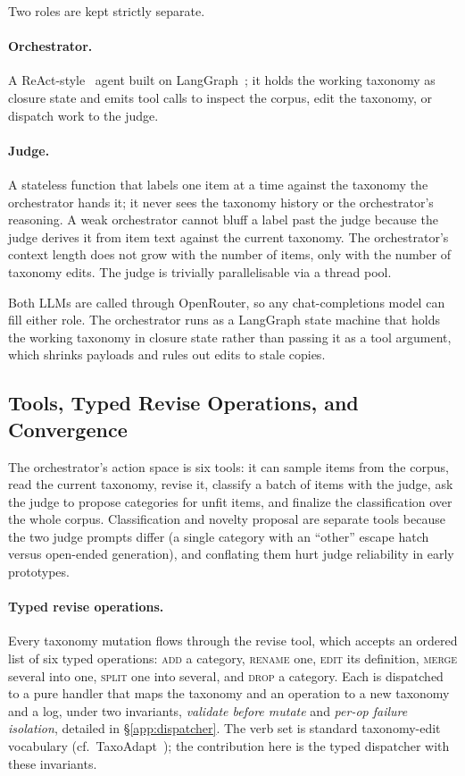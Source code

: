 Two roles are kept strictly separate.

\paragraph{Orchestrator.}
A ReAct-style~\citep{yao2022react} agent built on
LangGraph~\citep{langgraph}; it holds the working taxonomy as closure
state and emits tool calls to inspect the corpus, edit the taxonomy, or
dispatch work to the judge.

\paragraph{Judge.}
A stateless function that labels one item at a time against the
taxonomy the orchestrator hands it; it never sees the taxonomy
history or the orchestrator's reasoning. A weak orchestrator cannot
bluff a label past the judge because the judge derives it from item
text against the current taxonomy. The orchestrator's context length
does not grow with the number of items, only with the number of
taxonomy edits. The judge is trivially parallelisable via a thread
pool.

Both LLMs are called through OpenRouter, so any chat-completions model
can fill either role. The orchestrator runs as a LangGraph state machine
that holds the working taxonomy in closure state rather than passing it
as a tool argument, which shrinks payloads and rules out edits to stale
copies.

\subsection{Tools, Typed Revise Operations, and Convergence}
\label{sec:system:tools}

The orchestrator's action space is six tools: it can sample items from
the corpus, read the current taxonomy, revise it, classify a batch of
items with the judge, ask the judge to propose categories for unfit
items, and finalize the classification over the whole corpus.
Classification and novelty proposal are separate tools because the two
judge prompts differ (a single category with an ``other'' escape hatch
versus open-ended generation), and conflating them hurt judge
reliability in early prototypes.

\paragraph{Typed revise operations.}
Every taxonomy mutation flows through the revise tool, which accepts an
ordered list of six typed operations: \textsc{add} a category,
\textsc{rename} one, \textsc{edit} its definition, \textsc{merge} several
into one, \textsc{split} one into several, and \textsc{drop} a category.
Each is dispatched to a pure handler that maps the taxonomy and an
operation to a new taxonomy and a log, under two invariants,
\emph{validate before mutate} and \emph{per-op failure isolation},
detailed in \S\ref{app:dispatcher}. The verb set is standard
taxonomy-edit vocabulary (cf.\ TaxoAdapt~\citep{taxoadapt2025}); the
contribution here is the typed dispatcher with these invariants.

